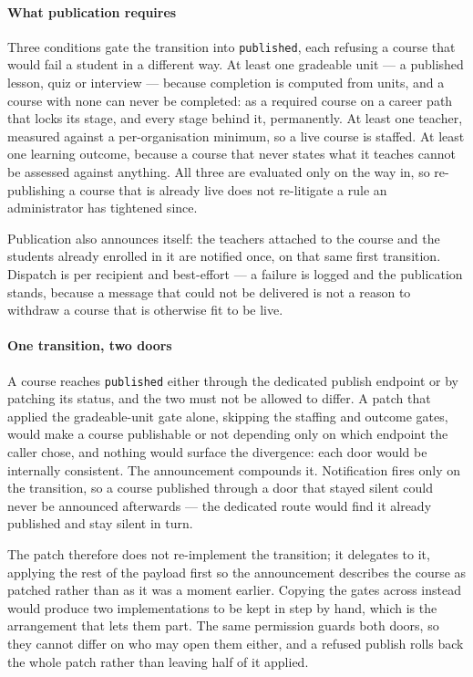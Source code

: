 \paragraph{What publication requires}
Three conditions gate the transition into \texttt{published}, each refusing a course that would fail a student in a different way. At least one gradeable unit --- a published lesson, quiz or interview --- because completion is computed from units, and a course with none can never be completed: as a required course on a career path that locks its stage, and every stage behind it, permanently. At least one teacher, measured against a per-organisation minimum, so a live course is staffed. At least one learning outcome, because a course that never states what it teaches cannot be assessed against anything. All three are evaluated only on the way in, so re-publishing a course that is already live does not re-litigate a rule an administrator has tightened since.

Publication also announces itself: the teachers attached to the course and the students already enrolled in it are notified once, on that same first transition. Dispatch is per recipient and best-effort --- a failure is logged and the publication stands, because a message that could not be delivered is not a reason to withdraw a course that is otherwise fit to be live.

\paragraph{One transition, two doors}
A course reaches \texttt{published} either through the dedicated publish endpoint or by patching its status, and the two must not be allowed to differ. A patch that applied the gradeable-unit gate alone, skipping the staffing and outcome gates, would make a course publishable or not depending only on which endpoint the caller chose, and nothing would surface the divergence: each door would be internally consistent. The announcement compounds it. Notification fires only on the transition, so a course published through a door that stayed silent could never be announced afterwards --- the dedicated route would find it already published and stay silent in turn.

The patch therefore does not re-implement the transition; it delegates to it, applying the rest of the payload first so the announcement describes the course as patched rather than as it was a moment earlier. Copying the gates across instead would produce two implementations to be kept in step by hand, which is the arrangement that lets them part. The same permission guards both doors, so they cannot differ on who may open them either, and a refused publish rolls back the whole patch rather than leaving half of it applied.

